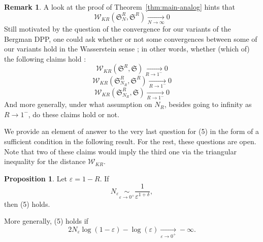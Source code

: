 \documentclass[11pt]{article}
\theoremstyle{plain}
\theoremstyle{definition}
\newtheorem{proposition}[definition]{Proposition}
\newtheorem{remark}[definition]{Remark}
\begin{document}
\begin{remark} 
A look at the proof of Theorem~\ref{thm:main-analog} hints that
\begin{equation}
\mathcal W_{KR} ( \mathfrak S^R_{N}, \mathfrak S^R ) \xrightarrow[N \to \infty]{} 0    
\end{equation}
Still motivated by the question of the convergence for our variants of the Bergman DPP, one could ask whether or not some convergences between some of our variants hold in the Wasserstein sense ; in other words, whether (which of) the following claims hold :
\begin{equation}
\mathcal W_{KR} ( \mathfrak S^R, \mathfrak S) \xrightarrow[R \to 1^-]{} 0
\end{equation}
\begin{equation} \label{e}
\mathcal W_{KR} ( \mathfrak S^R_{N_R}, \mathfrak S^R ) \xrightarrow[R \to 1^-]{} 0
\end{equation}
\begin{equation}
\mathcal W_{KR} ( \mathfrak S^R_{N_R}, \mathfrak S ) \xrightarrow[R \to 1^-]{} 0
\end{equation}
And more generally, under what assumption on $ N_R $, besides going to infinity as $ R \to 1^- $, do these claims hold or not. 

We provide an element of answer to the very last question for (5) in the form of a sufficient condition in the following result. For the rest, these questions are open. Note that two of these claims would imply the third one via the triangular inequality for the distance $ \mathcal W_{KR} $.
\end{remark}

\begin{proposition} Let $ \varepsilon = 1 - R $. If 
\begin{equation}
N_\varepsilon \underset{\varepsilon \to 0^+}{\sim} \frac{1}{\varepsilon^{1+\delta}},
\end{equation}
then (5) holds.
\end{proposition}

More generally, (5) holds if 
\begin{equation}
2N_\varepsilon  \log(1-\varepsilon) - \log(\varepsilon) \xrightarrow[\varepsilon \to 0^+]{} - \infty .
\end{equation}
\end{document}

